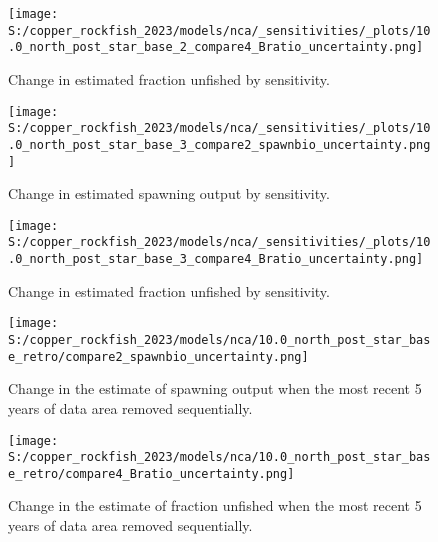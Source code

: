 \documentclass[11pt,
  letterpaper,
]{article}
\begin{document}
\newpage

\begin{figure}
{\centering
\texttt{[image: S:/copper\_rockfish\_2023/models/nca/\_sensitivities/\_plots/10.0\_north\_post\_star\_base\_2\_compare4\_Bratio\_uncertainty.png]}
}
\caption{Change in estimated fraction unfished by sensitivity.\label{fig:sens-depl-2}}
\end{figure}

\newpage

\begin{figure}
{\centering
\texttt{[image: S:/copper\_rockfish\_2023/models/nca/\_sensitivities/\_plots/10.0\_north\_post\_star\_base\_3\_compare2\_spawnbio\_uncertainty.png]}
}
\caption{Change in estimated spawning output by sensitivity.\label{fig:sens-ssb-3}}
\end{figure}

\newpage

\begin{figure}
{\centering
\texttt{[image: S:/copper\_rockfish\_2023/models/nca/\_sensitivities/\_plots/10.0\_north\_post\_star\_base\_3\_compare4\_Bratio\_uncertainty.png]}
}
\caption{Change in estimated fraction unfished by sensitivity.\label{fig:sens-depl-3}}
\end{figure}

\newpage

\begin{figure}
{\centering
\texttt{[image: S:/copper\_rockfish\_2023/models/nca/10.0\_north\_post\_star\_base\_retro/compare2\_spawnbio\_uncertainty.png]}
}
\caption{Change in the estimate of spawning output when the most recent 5 years of data area removed sequentially.\label{fig:retro-ssb}}
\end{figure}

\pagebreak

\begin{figure}
{\centering
\texttt{[image: S:/copper\_rockfish\_2023/models/nca/10.0\_north\_post\_star\_base\_retro/compare4\_Bratio\_uncertainty.png]}
}
\caption{Change in the estimate of fraction unfished when the most recent 5 years of data area removed sequentially.\label{fig:retro-depl}}
\end{figure}
\end{document}
